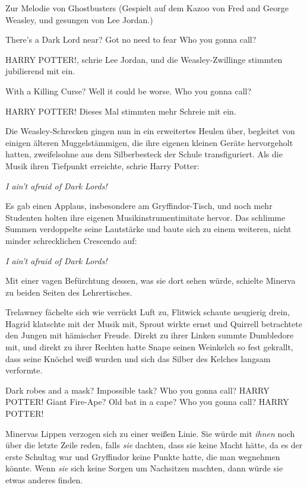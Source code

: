 \grqq{}Zur Melodie von \glqq{}Ghostbusters\grqq{} (Gespielt auf dem Kazoo von
Fred and George Weasley, und gesungen von Lee Jordan.)

There's a Dark Lord near? Got no need to fear Who you gonna call?

\glqq{}HARRY POTTER!\grqq{}, schrie Lee Jordan, und die Weasley-Zwillinge
stimmten jubilierend mit ein.

With a Killing Curse? Well it could be worse. Who you gonna call?

\glqq{}HARRY POTTER!\grqq{} Dieses Mal stimmten mehr Schreie mit ein.

Die Weasley-Schrecken gingen nun in ein erweitertes Heulen über, begleitet von
einigen älteren Muggelstämmigen, die ihre eigenen kleinen Geräte hervorgeholt
hatten, zweifelsohne aus dem Silberbesteck der Schule transfiguriert. Als die
Musik ihren Tiefpunkt erreichte, schrie Harry Potter:

\emph{I ain’t afraid of Dark Lords!}

Es gab einen Applaus, insbesondere am Gryffindor-Tisch, und noch mehr Studenten
holten ihre eigenen Musikinstrumentimitate hervor. Das schlimme Summen
verdoppelte seine Lautstärke und baute sich zu einem weiteren, nicht minder
schrecklichen Crescendo auf:

\emph{I ain’t afraid of Dark Lords!}

Mit einer vagen Befürchtung dessen, was sie dort sehen würde, schielte Minerva
zu beiden Seiten des Lehrertisches.

Trelawney fächelte sich wie verrückt Luft zu, Flitwick schaute neugierig drein,
Hagrid klatschte mit der Musik mit, Sprout wirkte ernst und Quirrell betrachtete
den Jungen mit hämischer Freude. Direkt zu ihrer Linken summte Dumbledore mit,
und direkt zu ihrer Rechten hatte Snape seinen Weinkelch so fest gekrallt, dass
seine Knöchel weiß wurden und sich das Silber des Kelches langsam verformte.

\grqq{}Dark robes and a mask? Impossible task? Who you gonna call? HARRY POTTER!
Giant Fire-Ape? Old bat in a cape? Who you gonna call? HARRY POTTER!

Minervas Lippen verzogen sich zu einer weißen Linie. Sie würde mit \emph{ihnen}
noch über die letzte Zeile reden, falls \emph{sie} dachten, dass sie keine Macht
hätte, da es der erste Schultag war und Gryffindor keine Punkte hatte, die man
wegnehmen könnte. Wenn \emph{sie} sich keine Sorgen um Nachsitzen machten, dann
würde sie etwas anderes finden.

